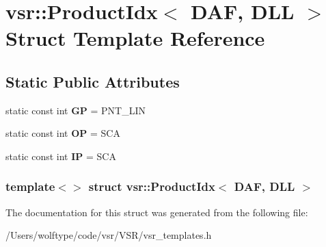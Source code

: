 \hypertarget{structvsr_1_1_product_idx_3_01_d_a_f_00_01_d_l_l_01_4}{\section{vsr\-:\-:Product\-Idx$<$ D\-A\-F, D\-L\-L $>$ Struct Template Reference}
\label{structvsr_1_1_product_idx_3_01_d_a_f_00_01_d_l_l_01_4}
}
\subsection*{Static Public Attributes}
\begin{DoxyCompactItemize}
\item 
\hypertarget{structvsr_1_1_product_idx_3_01_d_a_f_00_01_d_l_l_01_4_a729454903a42d8b435a022e2703f9650}{static const int {\bfseries G\-P} = P\-N\-T\-\_\-\-L\-I\-N}\label{structvsr_1_1_product_idx_3_01_d_a_f_00_01_d_l_l_01_4_a729454903a42d8b435a022e2703f9650}

\item 
\hypertarget{structvsr_1_1_product_idx_3_01_d_a_f_00_01_d_l_l_01_4_a47dfdd9452587820e0eb5c3e8ff964d6}{static const int {\bfseries O\-P} = S\-C\-A}\label{structvsr_1_1_product_idx_3_01_d_a_f_00_01_d_l_l_01_4_a47dfdd9452587820e0eb5c3e8ff964d6}

\item 
\hypertarget{structvsr_1_1_product_idx_3_01_d_a_f_00_01_d_l_l_01_4_abae84e974b402b14c872de0d89ef5ae2}{static const int {\bfseries I\-P} = S\-C\-A}\label{structvsr_1_1_product_idx_3_01_d_a_f_00_01_d_l_l_01_4_abae84e974b402b14c872de0d89ef5ae2}

\end{DoxyCompactItemize}
\subsubsection*{template$<$$>$ struct vsr\-::\-Product\-Idx$<$ D\-A\-F, D\-L\-L $>$}



The documentation for this struct was generated from the following file\-:\begin{DoxyCompactItemize}
\item 
/\-Users/wolftype/code/vsr/\-V\-S\-R/vsr\-\_\-templates.\-h\end{DoxyCompactItemize}
